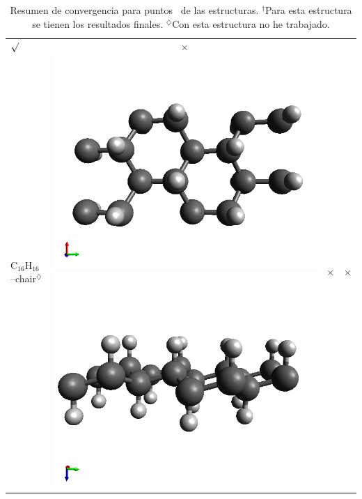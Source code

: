 \documentclass[11pt]{article}
\begin{document}
\begin{table}[h!]
\begin{tabular}[b]{ l c c c }
	{ $\surd$} & { $\times$} \\
	{ C$_{16}$H$_{16}$--chair$^{\diamondsuit}$} & 	
	\includegraphics[width=0.12\tw]{../structures_figures/C16H16_chair1.png} 
	\includegraphics[width=0.12\tw]{../structures_figures/C16H16_chair2.png} &
	{ $\times$} & { $\times$}\\ \\
	
	\hline
	\hline
\end{tabular}
\caption{Resumen de convergencia para puntos \vk \ de las estructuras. $^{\dag}$Para esta estructura se tienen los resultados finales. $^{\diamondsuit}$Con esta estructura no he trabajado.}
\end{table}
\end{document}
